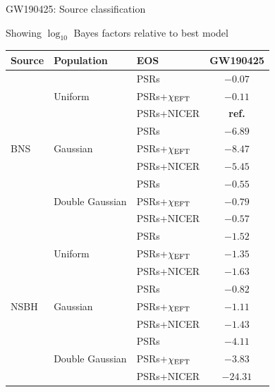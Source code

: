 \documentclass[usenames,dvipsnames,t]{beamer}
\begin{document}
\begin{frame}{GW190425: Source classification}

  Showing $\log_{10}$ Bayes factors relative to best model

  \vspace{3mm}

  \begin{table}
    \centering
    \scriptsize
    \begin{tabular}{|l|l|l|c|}
    \hline
    \textbf{Source} & \textbf{Population} & \textbf{EOS} & \textbf{GW190425} \\
    \hline\hline
    \multirow{9}{*}{BNS} & \multirow{3}{*}{Uniform} & PSRs & \cellcolor{jeffreysred1}$-0.07$ \\
    \cline{3-4}
     &  & PSRs+$\chi_{\rm{EFT}}$ & \cellcolor{jeffreysred1}$-0.11$ \\
    \cline{3-4}
     &  & PSRs+NICER & \textbf{ref.} \\
    \cline{2-4}
     & \multirow{3}{*}{Gaussian} & PSRs & \cellcolor{jeffreysred5}$-6.89$ \\
    \cline{3-4}
     &  & PSRs+$\chi_{\rm{EFT}}$ & \cellcolor{jeffreysred5}$-8.47$ \\
    \cline{3-4}
     &  & PSRs+NICER & \cellcolor{jeffreysred5}$-5.45$ \\
    \cline{2-4}
     & \multirow{3}{*}{Double Gaussian} & PSRs & \cellcolor{jeffreysred2}$-0.55$ \\
    \cline{3-4}
     &  & PSRs+$\chi_{\rm{EFT}}$ & \cellcolor{jeffreysred2}$-0.79$ \\
    \cline{3-4}
     &  & PSRs+NICER & \cellcolor{jeffreysred2}$-0.57$ \\
    \hline\hline
    \multirow{9}{*}{NSBH} & \multirow{3}{*}{Uniform} & PSRs & \cellcolor{jeffreysred4}$-1.52$ \\
    \cline{3-4}
     &  & PSRs+$\chi_{\rm{EFT}}$ & \cellcolor{jeffreysred3}$-1.35$ \\
    \cline{3-4}
     &  & PSRs+NICER & \cellcolor{jeffreysred4}$-1.63$ \\
    \cline{2-4}
     & \multirow{3}{*}{Gaussian} & PSRs & \cellcolor{jeffreysred2}$-0.82$ \\
    \cline{3-4}
     &  & PSRs+$\chi_{\rm{EFT}}$ & \cellcolor{jeffreysred3}$-1.11$ \\
    \cline{3-4}
     &  & PSRs+NICER & \cellcolor{jeffreysred3}$-1.43$ \\
    \cline{2-4}
     & \multirow{3}{*}{Double Gaussian} & PSRs & \cellcolor{jeffreysred5}$-4.11$ \\
    \cline{3-4}
     &  & PSRs+$\chi_{\rm{EFT}}$ & \cellcolor{jeffreysred5}$-3.83$ \\
    \cline{3-4}
     &  & PSRs+NICER & \cellcolor{jeffreysred5}$-24.31$ \\
    \hline
    \end{tabular}
  \end{table}
\end{frame}
\end{document}
